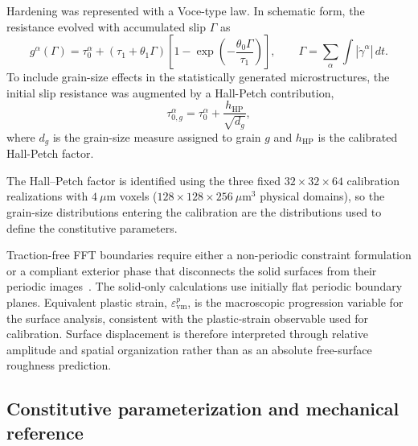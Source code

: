 \documentclass[final,12pt]{cas-sc}
\begin{document}
Hardening was represented with a Voce-type law. In schematic form, the resistance evolved with accumulated slip $\Gamma$ as
\begin{equation}
    g^{\alpha}(\Gamma)
    =
    \tau_0^{\alpha}
    +
    \left(\tau_1+\theta_1\Gamma\right)
    \left[
    1-\exp\left(-\frac{\theta_0\Gamma}{\tau_1}\right)
    \right],
    \qquad
    \Gamma=\sum_{\alpha}\int |\dot{\gamma}^{\alpha}|\,dt .
\end{equation}
To include grain-size effects in the statistically generated microstructures, the initial slip resistance was augmented by a Hall-Petch contribution,
\begin{equation}
    \tau_{0,g}^{\alpha}
    =
    \tau_{0}^{\alpha}
    +
    \frac{h_{\mathrm{HP}}}{\sqrt{d_g}},
\end{equation}
where $d_g$ is the grain-size measure assigned to grain $g$ and $h_{\mathrm{HP}}$ is the calibrated Hall-Petch factor.

The Hall--Petch factor is identified using the three fixed
$32\times32\times64$ calibration realizations with $4~\mu$m voxels
($128\times128\times256~\mu\mathrm{m}^3$ physical domains), so the grain-size
distributions entering the calibration are the distributions used to define
the constitutive parameters.

Traction-free FFT boundaries require either a non-periodic constraint formulation or a compliant exterior phase that disconnects the solid surfaces from their periodic images~\cite{cocke2023damage,zecevic2025nonperiodic}. The solid-only calculations use initially flat periodic boundary planes. Equivalent plastic strain, $\varepsilon_{\mathrm{vm}}^p$, is the macroscopic progression variable for the surface analysis, consistent with the plastic-strain observable used for calibration. Surface displacement is therefore interpreted through relative amplitude and spatial organization rather than as an absolute free-surface roughness prediction.

\subsection{Constitutive parameterization and mechanical reference}
\end{document}
